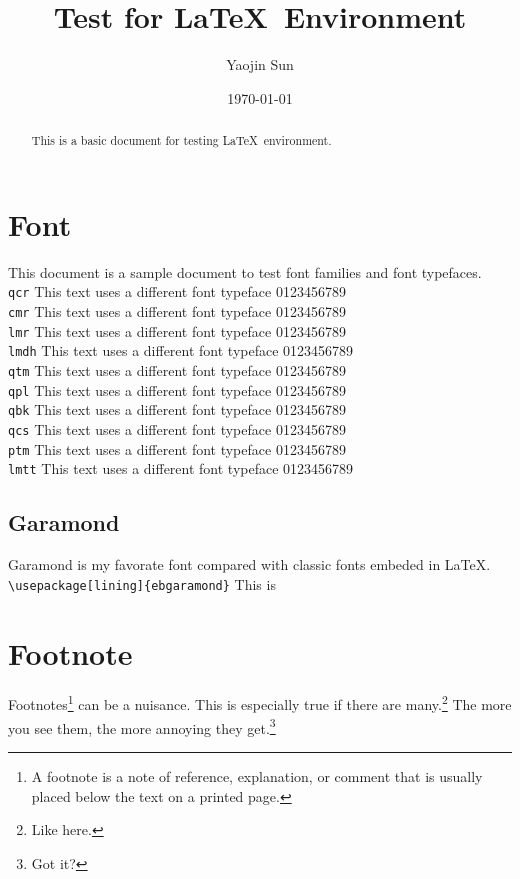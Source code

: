 \documentclass[12pt]{article}
\title{Test for \LaTeX~Environment}
\author{Yaojin Sun}
\date{\today}
\begin{document}
\maketitle

\begin{abstract}
	This is a basic document for testing \LaTeX~environment.
\end{abstract}

\section{Font}
This document is a sample document to 
test font families and font typefaces.
\\
\verb|qcr|
{\selectfont
This text uses a different font typeface 0123456789 
}\\
\verb|cmr|
{\selectfont
This text uses a different font typeface 0123456789
}\\
\verb|lmr|
{\selectfont
This text uses a different font typeface 0123456789
}\\
\verb|lmdh|
{\selectfont
This text uses a different font typeface 0123456789
}\\
\verb|qtm|
{\selectfont
This text uses a different font typeface 0123456789
}\\
\verb|qpl|
{\selectfont
This text uses a different font typeface 0123456789
}\\
\verb|qbk|
{\selectfont
This text uses a different font typeface 0123456789
}\\
\verb|qcs|
{\selectfont
This text uses a different font typeface 0123456789
}\\
\verb|ptm|
{\selectfont
This text uses a different font typeface 0123456789
}\\
\verb|lmtt|
{\selectfont
This text uses a different font typeface 0123456789
}\\

\subsection{Garamond}
Garamond is my favorate font compared with classic fonts embeded in \LaTeX.\\

\verb|\usepackage[lining]{ebgaramond}|
This is 

\section{Footnote}
Footnotes\footnote{A footnote is a note
of reference, explanation, or comment that is
usually placed below the text on a printed page.}
can be a nuisance. This is especially true if
there are many.\footnote{Like here.} The more you see
them, the more annoying they get.\footnote{Got it?}
\end{document}
